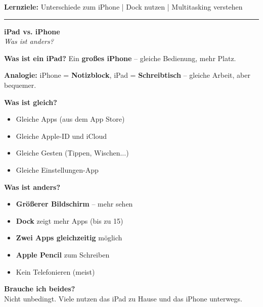 \documentclass[a4paper,landscape,8pt]{extarticle}
\begin{document}

 \hfill
{\footnotesize\textbf{Lernziele:} Unterschiede zum iPhone | Dock nutzen | Multitasking verstehen}

\vspace{1mm}
\hrule
\vspace{1mm}

\begin{minipage}[t]{0.32\linewidth}
\begin{center}
\colorbox{ipadsilver!15}{%
\begin{minipage}{0.95\linewidth}
\vspace{2mm}
\begin{center}
{\Large\bfseries\textcolor{ipadsilver}{iPad vs. iPhone}}\\[1pt]
{\footnotesize\itshape Was ist anders?}
\end{center}
\vspace{2mm}
\end{minipage}%
}
\end{center}

\vspace{1mm}

\textbf{Was ist ein iPad?} Ein \textbf{großes iPhone} -- gleiche Bedienung, mehr Platz.

\textbf{Analogie:} iPhone = \textbf{Notizblock}, iPad = \textbf{Schreibtisch} -- gleiche Arbeit, aber bequemer.

\textbf{Was ist gleich?}
\begin{itemize}
\item Gleiche Apps (aus dem App Store)
\item Gleiche Apple-ID und iCloud
\item Gleiche Gesten (Tippen, Wischen...)
\item Gleiche Einstellungen-App
\end{itemize}

\textbf{Was ist anders?}
\begin{itemize}
\item \textbf{Größerer Bildschirm} -- mehr sehen
\item \textbf{Dock} zeigt mehr Apps (bis zu 15)
\item \textbf{Zwei Apps gleichzeitig} möglich
\item \textbf{Apple Pencil} zum Schreiben
\item Kein Telefonieren (meist)
\end{itemize}

\textbf{Brauche ich beides?}\\
Nicht unbedingt. Viele nutzen das iPad zu Hause und das iPhone unterwegs.

\end{minipage}%
\end{document}
